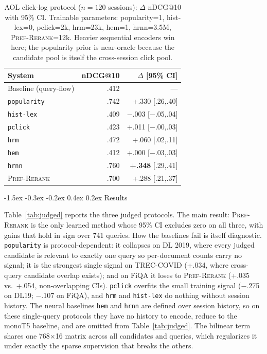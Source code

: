 \documentclass{article}
\makeatletter
\renewcommand{\subsection}{\@startsection{subsection}{2}{\z@}
  {-1.5ex \@plus -0.3ex \@minus -0.2ex}
  {0.4ex \@plus 0.2ex}
  {\normalfont\normalsize\bfseries}}
\makeatother
\begin{document}
\begin{table}[t]
\centering
\caption{AOL click-log protocol ($n{=}120$ sessions): $\Delta$ nDCG@10
with 95\% CI. Trainable parameters: popularity=1, hist-lex=0,
pclick=2k, hrm=23k, hem=1, hrnn=3.5M, \textsc{Pref-Rerank}=12k. Heavier
sequential encoders win here; the popularity prior is near-oracle
because the candidate pool is itself the cross-session click pool.}
\label{tab:aol}
\small
\begin{tabular}{lrr}
\toprule
System & nDCG@10 & $\Delta$ [95\% CI] \\
\midrule
Baseline (query-flow) & .412 & --- \\
\texttt{popularity} & .742 & +.330 [.26,.40] \\
\texttt{hist-lex} & .409 & $-$.003 [$-$.05,.04] \\
\texttt{pclick} & .423 & +.011 [$-$.00,.03] \\
\texttt{hrm} & .472 & +.060 [.02,.11] \\
\texttt{hem} & .412 & +.000 [$-$.03,.03] \\
\texttt{hrnn} & .760 & \textbf{+.348} [.29,.41] \\
\midrule
\textsc{Pref-Rerank} & .700 & +.288 [.21,.37] \\
\bottomrule
\end{tabular}
\end{table}

\subsection{Results}
\label{ssec:judged}

Table~\ref{tab:judged} reports the three judged protocols. The main
result: \textsc{Pref-Rerank} is the only learned method whose 95\% CI
excludes zero on all three, with gains that hold in sign over 741
queries. How the baselines fail is itself diagnostic. \texttt{popularity}
is protocol-dependent: it collapses on DL 2019, where every judged
candidate is relevant to exactly one query so per-document counts
carry no signal; it is the strongest single signal on TREC-COVID
(+.034, where cross-query candidate overlap exists); and on FiQA it
loses to \textsc{Pref-Rerank} (+.035 vs.\ +.054, non-overlapping CIs).
\texttt{pclick} overfits the small training signal ($-$.275 on DL19;
$-$.107 on FiQA), and \texttt{hrm} and \texttt{hist-lex} do nothing
without session history. The neural baselines \texttt{hem} and
\texttt{hrnn} are defined over session history, so on these
single-query protocols they have no history to encode, reduce to the
monoT5 baseline, and are omitted from Table~\ref{tab:judged}. The
bilinear term shares one 768$\times$16 matrix across all candidates
and queries, which regularizes it under exactly the sparse supervision
that breaks the others.
\end{document}
